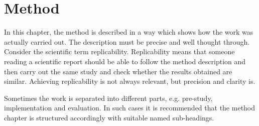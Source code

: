 \chapter{Method}
\label{cha:method}






In this chapter, the method is described in a way which shows how the
work was actually carried out. The description must be precise and
well thought through. Consider the scientific term
replicability. Replicability means that someone reading a scientific
report should be able to follow the method description and then carry
out the same study and check whether the results obtained are
similar. Achieving replicability is not always relevant, but precision
and clarity is.

Sometimes the work is separated into different parts, e.g.  pre-study,
implementation and evaluation. In such cases it is recommended that
the method chapter is structured accordingly with suitable named
sub-headings.
